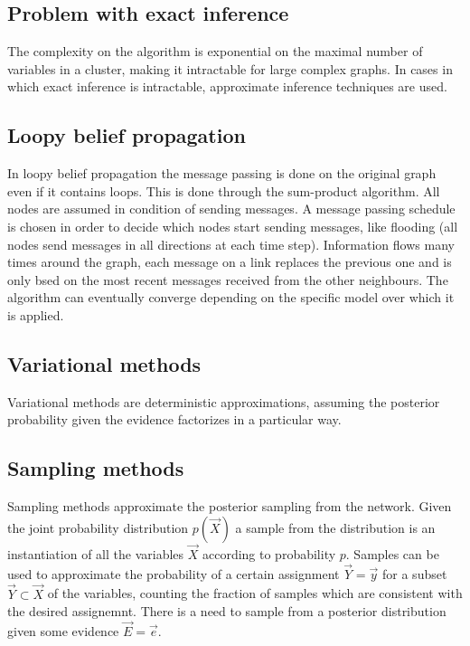 	\subsection{Problem with exact inference}
	The complexity on the algorithm is exponential on the maximal number of variables in a cluster, making it intractable for large complex graphs.
	In cases in which exact inference is intractable, approximate inference techniques are used.

	\subsection{Loopy belief propagation}
	In loopy belief propagation the message passing is done on the original graph even if it contains loops.
	This is done through the sum-product algorithm.
	All nodes are assumed in condition of sending messages.
	A message passing schedule is chosen in order to decide which nodes start sending messages, like flooding (all nodes send messages in all directions at each time step).
	Information flows many times around the graph, each message on a link replaces the previous one and is only bsed on the most recent messages received from the other neighbours.
	The algorithm can eventually converge depending on the specific model over which it is applied.

	\subsection{Variational methods}
	Variational methods are deterministic approximations, assuming the posterior probability given the evidence factorizes in a particular way.

	\subsection{Sampling methods}
	Sampling methods approximate the posterior sampling from the network.
	Given the joint probability distribution $p(\vec{X})$ a sample from the distribution is an instantiation of all the variables $\vec{X}$ according to probability $p$.
	Samples can be used to approximate the probability of a certain assignment $\vec{Y} = \vec{y}$ for a subset $\vec{Y}\subset\vec{X}$ of the variables, counting the fraction of samples which are consistent with the desired assignemnt.
	There is a need to sample from a posterior distribution given some evidence $\vec{E} = \vec{e}$.

